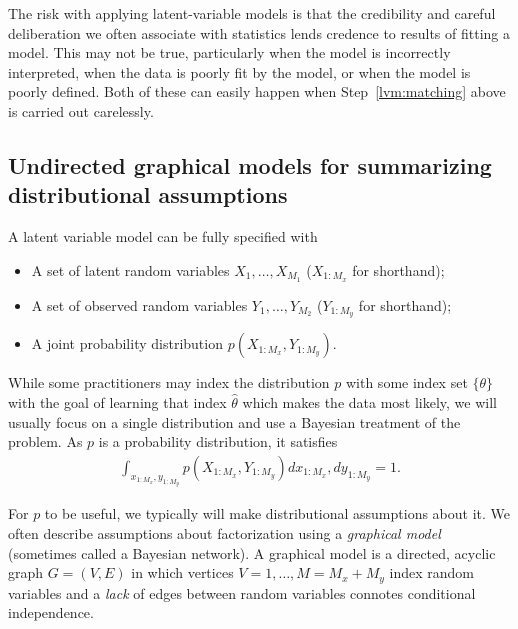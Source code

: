   The risk with applying latent-variable models is that the
  credibility and careful deliberation we often associate with
  statistics lends credence to results of fitting a model.  This may
  not be true, particularly when the model is incorrectly interpreted,
  when the data is poorly fit by the model, or when the model is
  poorly defined.  Both of these can easily happen when
  Step~\ref{lvm:matching} above is carried out carelessly.

\subsection{Undirected graphical models for summarizing distributional assumptions}
A latent variable model can be fully specified with
\begin{itemize}
  \item A set of latent random variables $X_1, \ldots, X_{M_1}$ ($X_{1:M_x}$ for shorthand);
  \item A set of observed random variables $Y_1, \ldots, Y_{M_2}$ ($Y_{1:M_y}$ for shorthand);
  \item A joint probability distribution $p(X_{1:M_x}, Y_{1:M_y})$.
\end{itemize}
While some practitioners may index the distribution $p$ with some
index set $\{ \theta \}$ with the goal of learning that index $\hat
\theta$ which makes the data most likely, we will usually focus on a
single distribution and use a Bayesian treatment of the problem.  As
$p$ is a probability distribution, it satisfies
\begin{align*}
  \int_{x_{1:M_x}, y_{1:M_y}} p(X_{1:M_x}, Y_{1:M_y}) d x_{1:M_x}, d
  y_{1:M_y} = 1.
\end{align*}
  
For $p$ to be useful, we typically will make distributional
assumptions about it.  We often describe assumptions about
factorization using a \emph{graphical model} (sometimes called a
Bayesian network).  A graphical model is a directed, acyclic graph $G
= (V, E)$ in which vertices $V=1, \ldots, M = M_x + M_y$
index random variables and a \emph{lack} of edges between random
variables connotes conditional independence.

